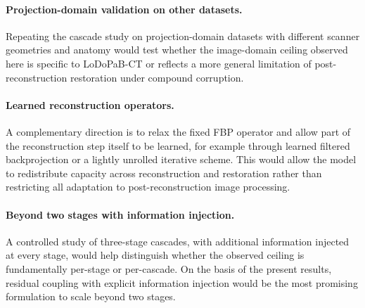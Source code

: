 \paragraph{Projection-domain validation on other datasets.}
Repeating the cascade study on projection-domain datasets with different scanner geometries and anatomy would test whether the image-domain ceiling observed here is specific to LoDoPaB-CT or reflects a more general limitation of post-reconstruction restoration under compound corruption.

\paragraph{Learned reconstruction operators.}
A complementary direction is to relax the fixed FBP operator and allow part of the reconstruction step itself to be learned, for example through learned filtered backprojection or a lightly unrolled iterative scheme. This would allow the model to redistribute capacity across reconstruction and restoration rather than restricting all adaptation to post-reconstruction image processing.

\paragraph{Beyond two stages with information injection.}
A controlled study of three-stage cascades, with additional information injected at every stage, would help distinguish whether the observed ceiling is fundamentally per-stage or per-cascade. On the basis of the present results, residual coupling with explicit information injection would be the most promising formulation to scale beyond two stages.